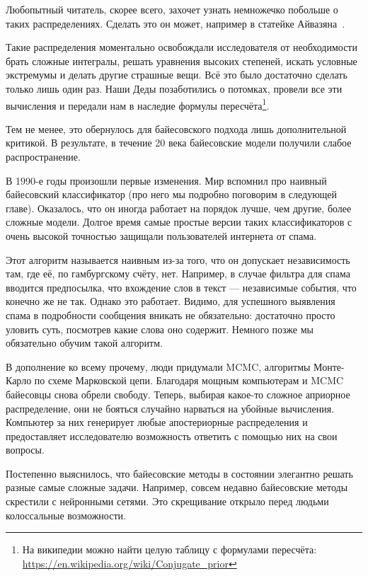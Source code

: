 Любопытный читатель, скорее всего, захочет узнать немножечко побольше о таких распределениях. Сделать это он может, например в статейке Айвазяна~\cite{aivaz2008}. 

Такие распределения моментально освобождали исследователя от необходимости брать сложные интегралы, решать уравнения высоких степеней, искать условные экстремумы и делать другие страшные вещи. Всё это было достаточно сделать только лишь один раз. Наши Деды позаботились о потомках, провели все эти вычисления и передали нам в наследие формулы пересчёта\footnote{На википедии можно найти целую таблицу с формулами пересчёта: \url{ https://en.wikipedia.org/wiki/Conjugate_prior}}.

Тем не менее, это обернулось для байесовского подхода лишь дополнительной критикой. В результате, в течение 20 века байесовские модели получили слабое распространение.  

В 1990-е годы произошли первые изменения. Мир вспомнил про наивный байесовский классификатор (про него мы подробно поговорим в следующей главе). Оказалось, что он иногда работает на порядок лучше, чем другие, более сложные модели. Долгое время самые простые версии таких классификаторов с очень высокой точностью защищали пользователей интернета от спама. 

Этот алгоритм называется наивным из-за того, что он допускает независимость там, где её, по гамбургскому счёту, нет. Например, в случае фильтра для спама вводится предпосылка, что вхождение слов в текст --- независимые события, что конечно же не так. Однако это работает. Видимо, для успешного выявления спама в подробности сообщения вникать не обязательно: достаточно просто уловить суть, посмотрев какие слова оно содержит. Немного позже мы обязательно обучим такой алгоритм.

В дополнение ко всему прочему, люди придумали MCMC, алгоритмы Монте-Карло по схеме Марковской цепи. Благодаря мощным компьютерам и MCMC байесовцы снова обрели свободу. Теперь, выбирая какое-то сложное априорное распределение, они не бояться случайно нарваться на убойные вычисления. Компьютер за них генерирует любые апостериорные распределения и предоставляет исследователю возможность ответить с помощью них на свои вопросы. 

Постепенно выяснилось, что байесовские методы в состоянии элегантно решать разные самые сложные задачи.  Например, совсем недавно байесовские методы скрестили с нейронными сетями. Это скрещивание открыло перед людьми колоссальные возможности. 

